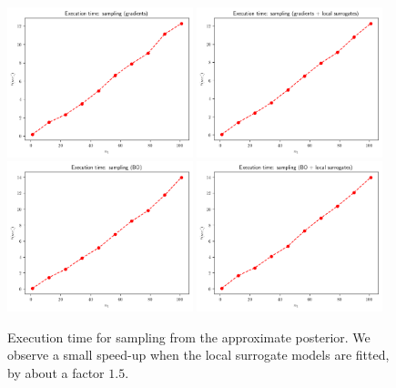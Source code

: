 \begin{figure}[ht]
    \begin{center}
      \includegraphics[width=0.48\textwidth]{./Thesis/images/chapter4/exec_sample_grad.png}
      \includegraphics[width=0.48\textwidth]{./Thesis/images/chapter4/exec_sample_grad_fit.png}\\
      \includegraphics[width=0.48\textwidth]{./Thesis/images/chapter4/exec_sample_bo.png}
      \includegraphics[width=0.48\textwidth]{./Thesis/images/chapter4/exec_sample_bo_fit.png}
    \end{center}
    \caption[Execution time for sampling from the approximate posterior.]{Execution time for sampling from the approximate
      posterior. We observe a small speed-up when the local surrogate
      models are fitted, by about a factor $1.5$.}
  \label{fig:exec_sample}
\end{figure}


